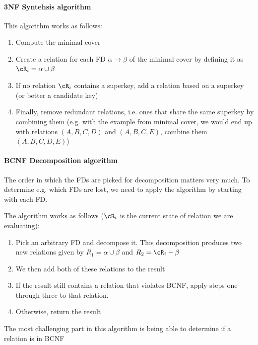 \paragraph{3NF Syntehsis algorithm}
This algorithm works as follows:
\begin{enumerate}
    \item Compute the minimal cover
    \item Create a relation for each FD $\alpha \rightarrow \beta$ of the minimal cover by defining it as $\cR_i = \alpha \cup \beta$
    \item If no relation $\cR_i$ contains a superkey, add a relation based on a superkey (or better a candidate key)
    \item Finally, remove redundant relations, i.e. ones that share the same superkey by combining them
          (e.g. with the example from minimal cover, we would end up with relations $(A, B, C, D)$ and $(A, B, C, E)$, combine them $(A, B, C, D, E)$)
\end{enumerate}


\paragraph{BCNF Decomposition algorithm}
The order in which the FDs are picked for decomposition matters very much. To determine e.g. which FDs are lost, we need to apply the algorithm by starting with each FD.

The algorithm works as follows ($\cR_i$ is the current state of relation we are evaluating):
\begin{enumerate}
    \item Pick an arbitrary FD and decompose it. This decomposition produces two new relations given by $R_1 = \alpha \cup \beta$ and $R_2 = \cR_i - \beta$
    \item We then add both of these relations to the result
    \item If the result still contains a relation that violates BCNF, apply steps one through three to that relation.
    \item Otherwise, return the result
\end{enumerate}
The most challenging part in this algorithm is being able to determine if a relation is in BCNF
